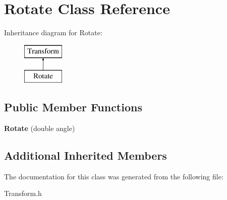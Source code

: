 \hypertarget{class_rotate}{}\section{Rotate Class Reference}
\label{class_rotate}
Inheritance diagram for Rotate\+:\begin{figure}[H]
\begin{center}
\leavevmode
\includegraphics[height=2.000000cm]{class_rotate}
\end{center}
\end{figure}
\subsection*{Public Member Functions}
\begin{DoxyCompactItemize}
\item 
\hypertarget{class_rotate_a9e117ee1fdce26779ee0fb4605d4e8ac}{}\label{class_rotate_a9e117ee1fdce26779ee0fb4605d4e8ac} 
{\bfseries Rotate} (double angle)
\end{DoxyCompactItemize}
\subsection*{Additional Inherited Members}


The documentation for this class was generated from the following file\+:\begin{DoxyCompactItemize}
\item 
Transform.\+h\end{DoxyCompactItemize}
